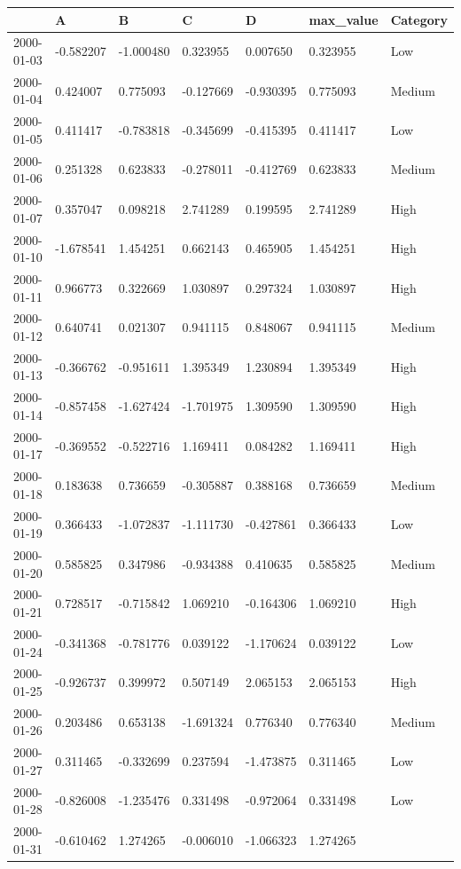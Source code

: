 \documentclass[
  letterpaper,
  DIV=11,
  numbers=noendperiod]{scrreport}
\begin{document}
\begin{longtable}[]{@{}lllllll@{}}
\toprule()
& A & B & C & D & max\_value & Category \\
\midrule()
\endhead
2000-01-03 & -0.582207 & -1.000480 & 0.323955 & 0.007650 & 0.323955 &
Low \\
2000-01-04 & 0.424007 & 0.775093 & -0.127669 & -0.930395 & 0.775093 &
Medium \\
2000-01-05 & 0.411417 & -0.783818 & -0.345699 & -0.415395 & 0.411417 &
Low \\
2000-01-06 & 0.251328 & 0.623833 & -0.278011 & -0.412769 & 0.623833 &
Medium \\
2000-01-07 & 0.357047 & 0.098218 & 2.741289 & 0.199595 & 2.741289 &
High \\
2000-01-10 & -1.678541 & 1.454251 & 0.662143 & 0.465905 & 1.454251 &
High \\
2000-01-11 & 0.966773 & 0.322669 & 1.030897 & 0.297324 & 1.030897 &
High \\
2000-01-12 & 0.640741 & 0.021307 & 0.941115 & 0.848067 & 0.941115 &
Medium \\
2000-01-13 & -0.366762 & -0.951611 & 1.395349 & 1.230894 & 1.395349 &
High \\
2000-01-14 & -0.857458 & -1.627424 & -1.701975 & 1.309590 & 1.309590 &
High \\
2000-01-17 & -0.369552 & -0.522716 & 1.169411 & 0.084282 & 1.169411 &
High \\
2000-01-18 & 0.183638 & 0.736659 & -0.305887 & 0.388168 & 0.736659 &
Medium \\
2000-01-19 & 0.366433 & -1.072837 & -1.111730 & -0.427861 & 0.366433 &
Low \\
2000-01-20 & 0.585825 & 0.347986 & -0.934388 & 0.410635 & 0.585825 &
Medium \\
2000-01-21 & 0.728517 & -0.715842 & 1.069210 & -0.164306 & 1.069210 &
High \\
2000-01-24 & -0.341368 & -0.781776 & 0.039122 & -1.170624 & 0.039122 &
Low \\
2000-01-25 & -0.926737 & 0.399972 & 0.507149 & 2.065153 & 2.065153 &
High \\
2000-01-26 & 0.203486 & 0.653138 & -1.691324 & 0.776340 & 0.776340 &
Medium \\
2000-01-27 & 0.311465 & -0.332699 & 0.237594 & -1.473875 & 0.311465 &
Low \\
2000-01-28 & -0.826008 & -1.235476 & 0.331498 & -0.972064 & 0.331498 &
Low \\
2000-01-31 & -0.610462 & 1.274265 & -0.006010 & -1.066323 & 1.274265 &

\end{longtable}
\end{document}
